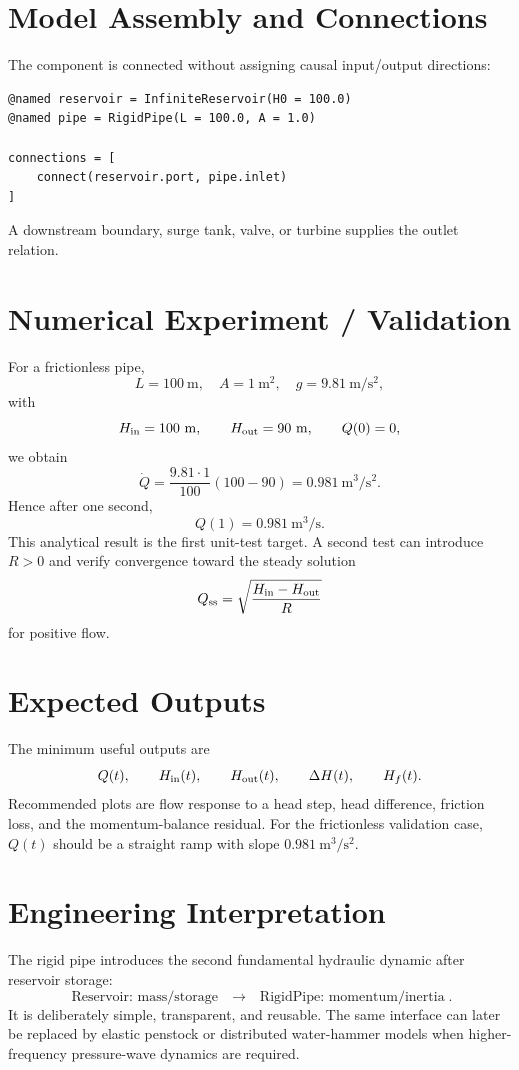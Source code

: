 \documentclass[11pt,a4paper]{article}
\begin{document}
\section{Model Assembly and Connections}
The component is connected without assigning causal input/output directions:
\begin{lstlisting}
@named reservoir = InfiniteReservoir(H0 = 100.0)
@named pipe = RigidPipe(L = 100.0, A = 1.0)

connections = [
    connect(reservoir.port, pipe.inlet)
]
\end{lstlisting}
A downstream boundary, surge tank, valve, or turbine supplies the outlet relation.

\section{Numerical Experiment / Validation}
For a frictionless pipe,
\[
L=100~\si{\meter},\quad A=1~\si{\meter\squared},\quad g=9.81~\si{\meter\per\second\squared},
\]
with
\[
H_{\rm in}=100~\si{\meter},\qquad H_{\rm out}=90~\si{\meter},\qquad Q(0)=0,
\]
we obtain
\[
\dot Q=\frac{9.81\cdot1}{100}(100-90)=0.981~\si{\meter\cubed\per\second\squared}.
\]
Hence after one second,
\[
\boxed{Q(1)=0.981~\si{\meter\cubed\per\second}}.
\]
This analytical result is the first unit-test target. A second test can introduce $R>0$ and verify convergence toward the steady solution
\[
Q_{\rm ss}=\sqrt{\frac{H_{\rm in}-H_{\rm out}}{R}}
\]
for positive flow.

\section{Expected Outputs}
The minimum useful outputs are
\[
Q(t),\qquad H_{\rm in}(t),\qquad H_{\rm out}(t),\qquad \Delta H(t),\qquad H_f(t).
\]
Recommended plots are flow response to a head step, head difference, friction loss, and the momentum-balance residual. For the frictionless validation case, $Q(t)$ should be a straight ramp with slope $0.981~\si{\meter\cubed\per\second\squared}$.

\section{Engineering Interpretation}
The rigid pipe introduces the second fundamental hydraulic dynamic after reservoir storage:
\[
\boxed{\text{Reservoir: mass/storage}\quad\rightarrow\quad\text{RigidPipe: momentum/inertia}}.
\]
It is deliberately simple, transparent, and reusable. The same interface can later be replaced by elastic penstock or distributed water-hammer models when higher-frequency pressure-wave dynamics are required.
\end{document}

